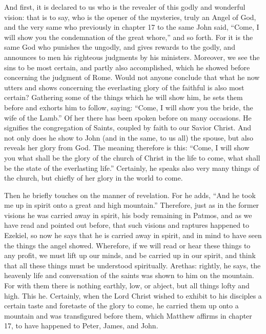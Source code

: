 And first, it is declared to us who is the revealer of this godly and wonderful vision: that is to say, who is the opener of the mysteries, truly an Angel of God, and the very same who previously in chapter 17 to the same John said, “Come, I will show you the condemnation of the great whore,” and so forth. For it is the same God who punishes the ungodly, and gives rewards to the godly, and announces to men his righteous judgments by his ministers. Moreover, we see the sins to be most certain, and partly also accomplished, which he showed before concerning the judgment of Rome. Would not anyone conclude that what he now utters and shows concerning the everlasting glory of the faithful is also most certain? Gathering some of the things which he will show him, he sets them before and exhorts him to follow, saying: “Come, I will show you the bride, the wife of the Lamb.” Of her there has been spoken before on many occasions. He signifies the congregation of Saints, coupled by faith to our Savior Christ. And not only does he show to John (and in the same, to us all) the spouse, but also reveals her glory from God. The meaning therefore is this: “Come, I will show you what shall be the glory of the church of Christ in the life to come, what shall be the state of the everlasting life.” Certainly, he speaks also very many things of the church, but chiefly of her glory in the world to come.

Then he briefly touches on the manner of revelation. For he adds, “And he took me up in spirit onto a great and high mountain.” Therefore, just as in the former visions he was carried away in spirit, his body remaining in Patmos, and as we have read and pointed out before, that such visions and raptures happened to Ezekiel, so now he says that he is carried away in spirit, and in mind to have seen the things the angel showed. Wherefore, if we will read or hear these things to any profit, we must lift up our minds, and be carried up in our spirit, and think that all these things must be understood spiritually. Arethas: rightly, he says, the heavenly life and conversation of the saints was shown to him on the mountain. For with them there is nothing earthly, low, or abject, but all things lofty and high. This he. Certainly, when the Lord Christ wished to exhibit to his disciples a certain taste and foretaste of the glory to come, he carried them up onto a mountain and was transfigured before them, which Matthew affirms in chapter 17, to have happened to Peter, James, and John.

